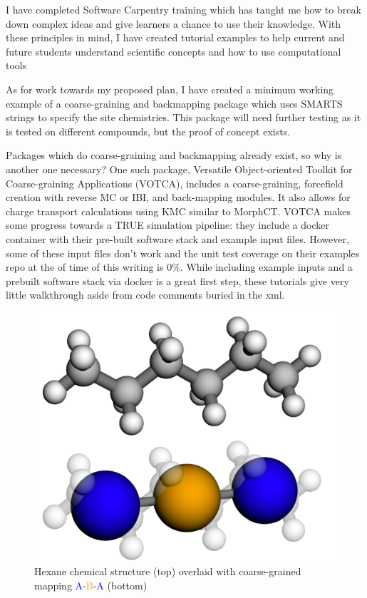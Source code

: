 I have completed Software Carpentry training which has taught me how to break down complex ideas and give learners a chance to use their knowledge.
With these principles in mind, I have created tutorial examples to help current and future students understand scientific concepts and how to use computational tools\cite{notebooktutorials}

As for work towards my proposed plan, I have created a minimum working example of a coarse-graining and backmapping package which uses SMARTS strings to specify the site chemistries\cite{grits}.
This package will need further testing as it is tested on different compounds, but the proof of concept exists.

Packages which do coarse-graining and backmapping already exist, so why is another one necessary?
One such package, Versatile Object-oriented Toolkit for Coarse-graining Applications (VOTCA)\cite{Ruhle2011b}, includes a coarse-graining, forcefield creation with reverse MC or IBI, and back-mapping modules.
It also allows for charge transport calculations using KMC similar to MorphCT\cite{Lukyanov2010}.
VOTCA makes some progress towards a TRUE simulation pipeline: they include a docker container with their pre-built software stack and example input files.
However, some of these input files don't work and the unit test coverage on their examples repo at the of time of this writing is 0\%.
While including example inputs and a prebuilt software stack via docker is a great first step, these tutorials give very little walkthrough aside from code comments buried in the xml\cite{votca-github}.
\begin{figure}
    \centering
    \includegraphics[width=\linewidth]{images/hexane-compare.pdf}
    \caption{Hexane chemical structure (top) overlaid with coarse-grained mapping \textcolor{blue}{A}-\textcolor{orange}{B}-\textcolor{blue}{A} (bottom)}\label{hexane}
\end{figure}
